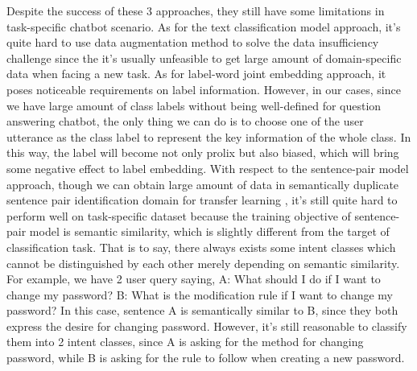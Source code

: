 \documentclass[letterpaper]{article} %
\begin{document}
  Despite the success of these 3 approaches, they still have some limitations in
  task-specific chatbot scenario. As for the text classification model approach,
  it's   quite   hard  to  use  data  augmentation  method  to  solve  the  data
  insufficiency  challenge since the it's usually unfeasible to get large amount
  of  domain-specific  data  when  facing  a  new  task. As for label-word joint
  embedding  approach,  it  poses  noticeable requirements on label information.
  However,  in  our  cases,  since  we have large amount of class labels without
  being well-defined for question answering chatbot, the only thing we can do is
  to  choose  one  of the user utterance as the class label to represent the key
  information  of  the  whole class. In this way, the label will become not only
  prolix  but  also  biased,  which  will  bring  some  negative effect to label
  embedding.  With  respect  to  the sentence-pair model approach, though we can
  obtain   large   amount  of  data  in  semantically  duplicate  sentence  pair
  identification  domain  for  transfer  learning \cite{sun2019fine},  it's still
  quite  hard  to  perform  well  on  task-specific dataset because the training
  objective  of  sentence-pair  model  is semantic similarity, which is slightly
  different from the target of classification task. That is to say, there always
  exists  some intent classes which cannot be distinguished by each other merely
  depending on semantic similarity. For example, we have 2 user query saying, A:
  What  should I do if I want to change my password? B: What is the modification
  rule if I want to change my password? In this case, sentence A is semantically
  similar  to  B,  since  they  both  express  the desire for changing password.
  However, it's still reasonable to classify them into 2 intent classes, since A
  is asking for the method for changing password, while B is asking for the rule
  to follow when creating a new password.
\end{document}
